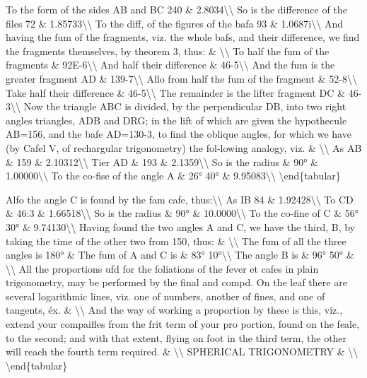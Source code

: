 \documentclass{article}
\begin{document}
To the form of the sides AB and BC 240 \& 2.8034\textbackslash{}\textbackslash{}
So is the difference of the files 72 \& 1.85733\textbackslash{}\textbackslash{}
To the diff, of the figures of the bafa 93 \& 1.0687i\textbackslash{}\textbackslash{}
And having the fum of the fragments, viz. the whole bafs, and their difference, we find the fragments themselves, by theorem 3, thus: \& \textbackslash{}\textbackslash{}
To half the fum of the fragments \& 92E-6\textbackslash{}\textbackslash{}
And half their difference \& 46-5\textbackslash{}\textbackslash{}
And the fum is the greater fragment AD \& 139-7\textbackslash{}\textbackslash{}
Allo from half the fum of the fragment \& 52-8\textbackslash{}\textbackslash{}
Take half their difference \& 46-5\textbackslash{}\textbackslash{}
The remainder is the lifter fragment DC \& 46-3\textbackslash{}\textbackslash{}
Now the triangle ABC is divided, by the perpendicular DB, into two right angles triangles, ADB and DRG; in the lift of which are given the hypothecule AB=156, and the bafe AD=130-3, to find the oblique angles, for which we have (by Cafel V, of rechargular trigonometry) the fol-lowing analogy, viz. \& \textbackslash{}\textbackslash{}
As AB \& 159 \& 2.10312\textbackslash{}\textbackslash{}
Tier AD \& 193 \& 2.1359\textbackslash{}\textbackslash{}
So is the radius \& 90° \& 1.00000\textbackslash{}\textbackslash{}
To the co-fise of the angle A \& 26° 40° \& 9.95083\textbackslash{}\textbackslash{}
\textbackslash{}end\{tabular\}

Alfo the angle C is found by the fam cafe, thus:\textbackslash{}\textbackslash{}
As IB 84 \& 1.92428\textbackslash{}\textbackslash{}
To CD \& 46:3 \& 1.66518\textbackslash{}\textbackslash{}
So is the radius \& 90° \& 10.0000\textbackslash{}\textbackslash{}
To the co-fine of C \& 56° 30° \& 9.74130\textbackslash{}\textbackslash{}
Having found the two angles A and C, we have the third, B, by taking the time of the other two from 150, thus: \& \textbackslash{}\textbackslash{}
The fum of all the three angles is 180° \& The fum of A and C is \& 83° 10°\textbackslash{}\textbackslash{}
The angle B is \& 96° 50° \& \textbackslash{}\textbackslash{}
All the proportions ufd for the foliations of the fever et cafes in plain trigonometry, may be performed by the final and compd. On the leaf there are several logarithmic lines, viz. one of numbers, another of fines, and one of tangents, éx. \& \textbackslash{}\textbackslash{}
And the way of working a proportion by these is this, viz., extend your compaifles from the frit term of your pro portion, found on the feale, to the second; and with that extent, flying on foot in the third term, the other will reach the fourth term required. \& \textbackslash{}\textbackslash{}
SPHERICAL TRIGONOMETRY \& \textbackslash{}\textbackslash{}
\textbackslash{}end\{tabular\}
\end{document}
